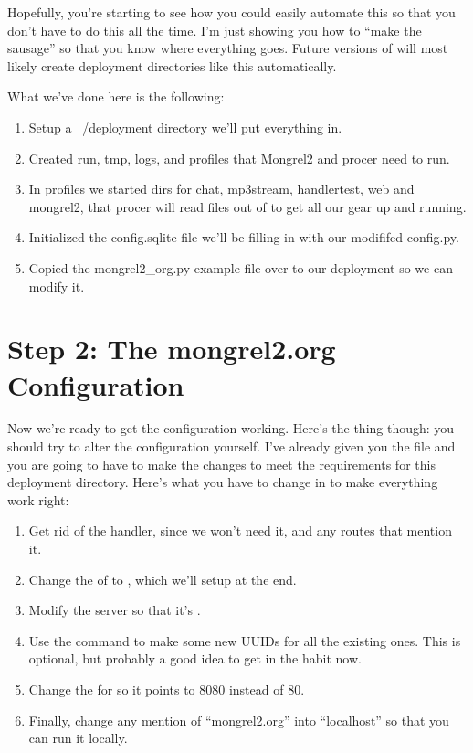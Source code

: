 Hopefully, you're starting to see how you could easily automate this so that you don't
have to do this all the time.  I'm just showing you how to ``make the sausage'' so that
you know where everything goes.  Future versions of  will most likely
create deployment directories like this automatically.

What we've done here is the following:

\begin{enumerate}
\item Setup a ~/deployment directory we'll put everything in.
\item Created run, tmp, logs, and profiles that Mongrel2 and procer need to run.
\item In profiles we started dirs for chat, mp3stream, handlertest, web and mongrel2,
    that procer will read files out of to get all our gear up and running.
\item Initialized the config.sqlite file we'll be filling in with our modififed config.py.
\item Copied the mongrel2\_org.py example file over to our deployment so we can modify it.
\end{enumerate}


\section{Step 2: The mongrel2.org Configuration}

Now we're ready to get the configuration working.  Here's the thing though: you should
try to alter the configuration yourself.  I've already given you the file and you are
going to have to make the changes to meet the requirements for this deployment directory.
Here's what you have to change in  to make everything work right:

\begin{enumerate}
\item Get rid of the  handler, since we won't need it, and
    any routes that mention it.
\item Change the  of  to , which we'll setup at the end.
\item Modify the server  so that it's .
\item Use the  command to make some new UUIDs for all the
    existing ones.  This is optional, but probably a good idea to get in the
    habit now.
\item Change the  for  so it points to 8080 instead of 80.
\item Finally, change any mention of ``mongrel2.org'' into ``localhost'' so that you
    can run it locally.
\end{enumerate}

